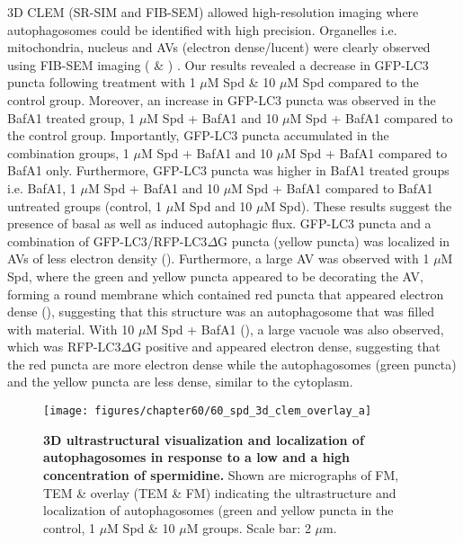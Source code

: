 3D CLEM (SR-SIM and FIB-SEM) allowed high-resolution imaging where autophagosomes could be identified with high precision. Organelles i.e. mitochondria, nucleus and AVs (electron dense/lucent) were clearly observed using FIB-SEM imaging ( \& ) . Our results revealed a decrease in GFP-LC3 puncta following treatment with 1 $\mu$M Spd \& 10 $\mu$M Spd compared to the control group. Moreover, an increase in GFP-LC3 puncta was observed in the BafA1 treated group, 1 $\mu$M Spd + BafA1 and 10 $\mu$M Spd + BafA1 compared to the control group. Importantly, GFP-LC3 puncta accumulated in the combination groups, 1 $\mu$M Spd + BafA1 and 10 $\mu$M Spd + BafA1 compared to BafA1 only. Furthermore, GFP-LC3 puncta was higher in BafA1 treated groups i.e. BafA1, 1 $\mu$M Spd + BafA1 and 10 $\mu$M Spd + BafA1 compared to BafA1 untreated groups (control, 1 $\mu$M Spd and 10 $\mu$M Spd). These results suggest the presence of basal as well as induced autophagic flux. GFP-LC3 puncta and a combination of GFP-LC3/RFP-LC3$\Delta$G puncta (yellow puncta) was localized in AVs of less electron density (). Furthermore, a large AV was observed with 1 $\mu$M Spd, where the green and yellow puncta appeared to be decorating the AV, forming a round membrane which contained red puncta that appeared electron dense (), suggesting that this structure was an autophagosome that was filled with material. With 10 $\mu$M Spd + BafA1 (), a large vacuole was also observed, which was RFP-LC3$\Delta$G positive and appeared electron dense, suggesting that the red puncta are more electron dense while the autophagosomes (green puncta) and the yellow puncta are less dense, similar to the cytoplasm. 

\begin{landscape}
\begin{figure}[!htbp]
\center
 \texttt{[image: figures/chapter60/60\_spd\_3d\_clem\_overlay\_a]}
 \caption[3D ultrastructural visualization and localization of autophagosomes in response to a low and a high concentration of spermidine]{\textbf{3D ultrastructural visualization and localization of autophagosomes in response to a low and a high concentration of spermidine.} Shown are micrographs of FM, TEM \& overlay (TEM \& FM) indicating the ultrastructure and localization of autophagosomes (green and yellow puncta in the control, 1 $\mu$M Spd \& 10 $\mu$M groups. Scale bar: 2 $\mu$m.}
 \label{fig:60_spd_3d_clem_overlay_a}
\end{figure} 
\end{landscape}

